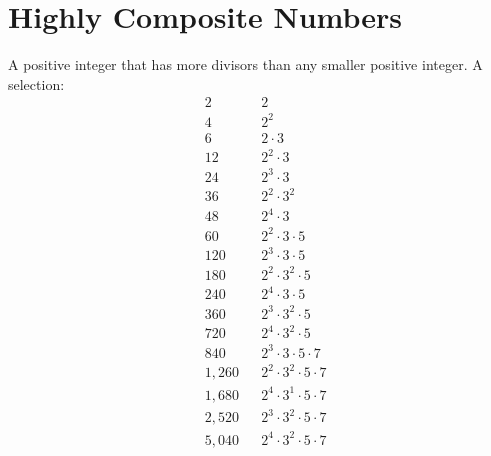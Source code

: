 
\section*{Highly Composite Numbers}
A positive integer that has more divisors than any smaller positive integer. A selection:
\begin{align*}
& 2            &&	2\\
& 4 	         && 2^{2}\\
& 6            && 2 \cdot 3\\
& 12           && 2^{2} \cdot 3\\
& 24 	         && 2^{3} \cdot 3 \\
& 36 	         && 2^{2} \cdot 3^{2} \\
& 48 	         && 2^{4} \cdot 3 \\
& 60	         && 2^{2} \cdot 3 \cdot 5\\
& 120          && 2^{3} \cdot 3 \cdot 5\\
& 180          && 2^{2} \cdot 3^{2} \cdot 5\\
& 240 	       && 2^{4} \cdot 3 \cdot 5\\
& 360          && 2^{3} \cdot 3^{2} \cdot 5\\
& 720 	       && 2^{4} \cdot 3^{2} \cdot 5\\
& 840 	       && 2^{3} \cdot 3 \cdot 5 \cdot 7\\
& 1,260 	     && 2^{2} \cdot 3^{2} \cdot 5 \cdot 7\\
& 1,680 	     && 2^{4} \cdot 3^{1} \cdot 5 \cdot 7\\
& 2,520        && 2^{3} \cdot 3^{2} \cdot 5 \cdot 7\\
& 5,040        && 2^{4} \cdot 3^{2} \cdot 5 \cdot 7\\
\end{align*}
